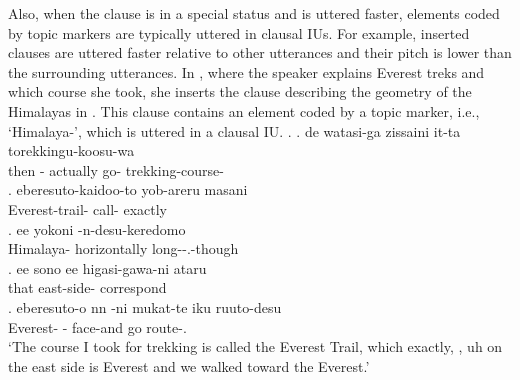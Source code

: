 Also,
when the clause is in a special status and is uttered faster,
elements coded by topic markers are typically uttered in clausal IUs.
For example, inserted clauses are uttered faster relative to other utterances and their pitch is lower than the surrounding utterances.
In \Next, where the speaker explains Everest treks and which course she took,
she inserts the clause describing the geometry of the Himalayas in \Next[c].
This clause contains an element coded by a topic marker, i.e.,  `Himalaya-',
which is uttered in a clausal IU.
%
\ex.\label{S01F0151_himaraya}
 \ag. de watasi-ga \tp{\dvline} zissaini \tp{\dvline} it-ta \tp{\dvline} torekkingu-koosu-wa \tp{\dvline} \\
 	then - {} actually {} go- {} trekking-course- {} \\
 \bg. eberesuto-kaidoo-to yob-areru \tp{\dvline} masani \tp{\dvline} \\
 	Everest-trail- call- {} exactly {} \\
 \bg. ee  yokoni -n-desu-keredomo \tp{\dvline} \\
 	 Himalaya- horizontally long--.-though {} \\
 \bg. ee sono \tp{\dvline} ee higasi-gawa-ni ataru \tp{\dvline} \\
 	 that {}  east-side- correspond {} \\
 \bg. eberesuto-o \tp{\dvline} nn -ni  mukat-te iku \tp{\dvline} ruuto-desu \\
 	Everest- {}  - face-and go {} route-. \\
	`The course I took for trekking is called the Everest Trail, which exactly, , uh on the east side is Everest and we walked toward the Everest.'

